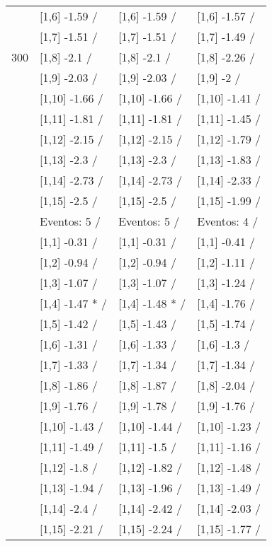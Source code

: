\begin{table}
\begin{tabular}[t]{llll}
 & {}[1,6] -1.59  / & {}[1,6] -1.59  / & {}[1,6] -1.57  /\\
 & {}[1,7] -1.51  / & {}[1,7] -1.51  / & {}[1,7] -1.49  /\\
300 & {}[1,8] -2.1  / & {}[1,8] -2.1  / & {}[1,8] -2.26  /\\
\addlinespace
 & {}[1,9] -2.03  / & {}[1,9] -2.03  / & {}[1,9] -2  /\\
 & {}[1,10] -1.66  / & {}[1,10] -1.66  / & {}[1,10] -1.41  /\\
 & {}[1,11] -1.81  / & {}[1,11] -1.81  / & {}[1,11] -1.45  /\\
 & {}[1,12] -2.15  / & {}[1,12] -2.15  / & {}[1,12] -1.79  /\\
 & {}[1,13] -2.3  / & {}[1,13] -2.3  / & {}[1,13] -1.83  /\\
\addlinespace
 & {}[1,14] -2.73  / & {}[1,14] -2.73  / & {}[1,14] -2.33  /\\
 & {}[1,15] -2.5  / & {}[1,15] -2.5  / & {}[1,15] -1.99  /\\
 & Eventos:  5 / & Eventos:  5 / & Eventos:  4 /\\
 & {}[1,1] -0.31  / & {}[1,1] -0.31  / & {}[1,1] -0.41  /\\
 & {}[1,2] -0.94  / & {}[1,2] -0.94  / & {}[1,2] -1.11  /\\
\addlinespace
 & {}[1,3] -1.07  / & {}[1,3] -1.07  / & {}[1,3] -1.24  /\\
 & {}[1,4] -1.47 * / & {}[1,4] -1.48 * / & {}[1,4] -1.76  /\\
 & {}[1,5] -1.42  / & {}[1,5] -1.43  / & {}[1,5] -1.74  /\\
 & {}[1,6] -1.31  / & {}[1,6] -1.33  / & {}[1,6] -1.3  /\\
 & {}[1,7] -1.33  / & {}[1,7] -1.34  / & {}[1,7] -1.34  /\\
\addlinespace
500 & {}[1,8] -1.86  / & {}[1,8] -1.87  / & {}[1,8] -2.04  /\\
 & {}[1,9] -1.76  / & {}[1,9] -1.78  / & {}[1,9] -1.76  /\\
 & {}[1,10] -1.43  / & {}[1,10] -1.44  / & {}[1,10] -1.23  /\\
 & {}[1,11] -1.49  / & {}[1,11] -1.5  / & {}[1,11] -1.16  /\\
 & {}[1,12] -1.8  / & {}[1,12] -1.82  / & {}[1,12] -1.48  /\\
\addlinespace
 & {}[1,13] -1.94  / & {}[1,13] -1.96  / & {}[1,13] -1.49  /\\
 & {}[1,14] -2.4  / & {}[1,14] -2.42  / & {}[1,14] -2.03  /\\
 & {}[1,15] -2.21  / & {}[1,15] -2.24  / & {}[1,15] -1.77  /\\
\bottomrule
\end{tabular}
\end{table}
